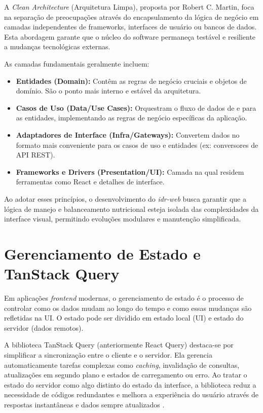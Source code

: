 A \textit{Clean Architecture} (Arquitetura Limpa), proposta por Robert C. Martin, foca na separação de preocupações através do encapsulamento da lógica de negócio em camadas independentes de frameworks, interfaces de usuário ou bancos de dados. Esta abordagem garante que o núcleo do software permaneça testável e resiliente a mudanças tecnológicas externas.

As camadas fundamentais geralmente incluem:
\begin{itemize}
    \item \textbf{Entidades (Domain):} Contêm as regras de negócio cruciais e objetos de domínio. São o ponto mais interno e estável da arquitetura.
    \item \textbf{Casos de Uso (Data/Use Cases):} Orquestram o fluxo de dados de e para as entidades, implementando as regras de negócio específicas da aplicação.
    \item \textbf{Adaptadores de Interface (Infra/Gateways):} Convertem dados no formato mais conveniente para os casos de uso e entidades (ex: conversores de \gls{API} \gls{REST}).
    \item \textbf{Frameworks e Drivers (Presentation/UI):} Camada na qual residem ferramentas como React e detalhes de interface.
\end{itemize}

Ao adotar esses princípios, o desenvolvimento do \textit{idr-web} busca garantir que a lógica de manejo e balanceamento nutricional esteja isolada das complexidades da interface visual, permitindo evoluções modulares e manutenção simplificada.

\section{Gerenciamento de Estado e TanStack Query}\label{sec:gerenciamentoEstado}

Em aplicações \textit{frontend} modernas, o gerenciamento de estado é o processo de controlar como os dados mudam ao longo do tempo e como essas mudanças são refletidas na \gls{UI}. O estado pode ser dividido em estado local (\gls{UI}) e estado do servidor (dados remotos).

A biblioteca TanStack Query (anteriormente React Query) destaca-se por simplificar a sincronização entre o cliente e o servidor. Ela gerencia automaticamente tarefas complexas como \textit{caching}, invalidação de consultas, atualizações em segundo plano e estados de carregamento ou erro. Ao tratar o estado do servidor como algo distinto do estado da interface, a biblioteca reduz a necessidade de códigos redundantes e melhora a experiência do usuário através de respostas instantâneas e dados sempre atualizados \cite{Dorfmeister:2022:ReactQueryGuide}.


